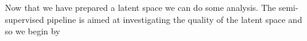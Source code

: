 \noindent Now that we have prepared a latent space we can do some analysis. The semi-supervised pipeline is aimed at investigating the quality of the  latent space and so we begin by

\begin{minipage}{\linewidth}
\begin{lstlisting}[language=iPython]

\end{lstlisting}

\end{minipage}


